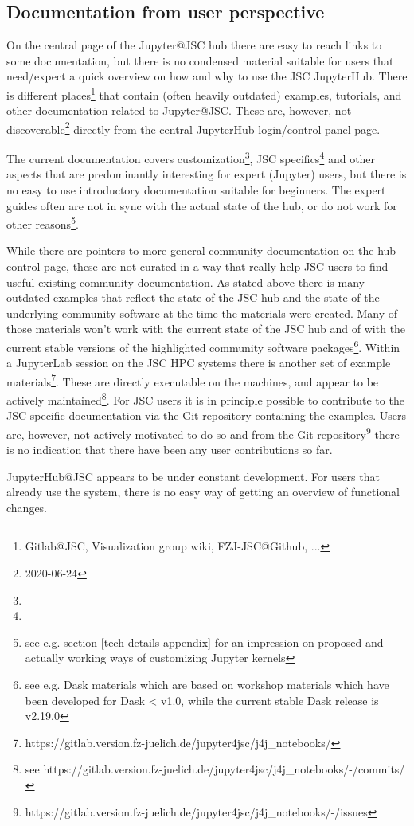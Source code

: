 
\subsection{Documentation from user perspective}
\label{s-doc-from-user-pov}

On the central page of the Jupyter@JSC hub there are easy to reach links to some documentation, but there is no condensed material suitable for users that need/expect a quick overview on how and why to use the JSC JupyterHub.
There is different places\footnote{Gitlab@JSC, Visualization group wiki, FZJ-JSC@Github, ...} that contain (often heavily outdated) examples, tutorials, and other documentation related to Jupyter@JSC.
These are, however, not discoverable\footnote{2020-06-24} directly from the central JupyterHub login/control panel page.

The current documentation covers customization\footnote{}, JSC specifics\footnote{} and other aspects that are predominantly interesting for expert (Jupyter) users, but there is no easy to use introductory documentation suitable for beginners.
The expert guides often are not in sync with the actual state of the hub, or do not work for other reasons\footnote{see e.g. section \ref{tech-details-appendix} for an impression on proposed and actually working ways of customizing Jupyter kernels}.

While there are pointers to more general community documentation on the hub control page, these are not curated in a way that really help JSC users to find useful existing community documentation.
As stated above there is many outdated examples that reflect the state of the JSC hub and the state of the underlying community software at the time the materials were created.
Many of those materials won't work with the current state of the JSC hub and of with the current stable versions of the highlighted community software packages\footnote{see e.g. Dask materials which are based on workshop materials which have been developed for Dask < v1.0, while the current stable Dask release is v2.19.0}.
Within a JupyterLab session on the JSC HPC systems there is another set of example materials\footnote{https://gitlab.version.fz-juelich.de/jupyter4jsc/j4j_notebooks/}.
These are directly executable on the machines, and appear to be actively maintained\footnote{see https://gitlab.version.fz-juelich.de/jupyter4jsc/j4j_notebooks/-/commits/}.
For JSC users it is in principle possible to contribute to the JSC-specific documentation via the Git repository containing the examples.
Users are, however, not actively motivated to do so and from the Git repository\footnote{https://gitlab.version.fz-juelich.de/jupyter4jsc/j4j_notebooks/-/issues} there is no indication that there have been any user contributions so far.

JupyterHub@JSC appears to be under constant development.
For users that already use the system, there is no easy way of getting an overview of functional changes.
